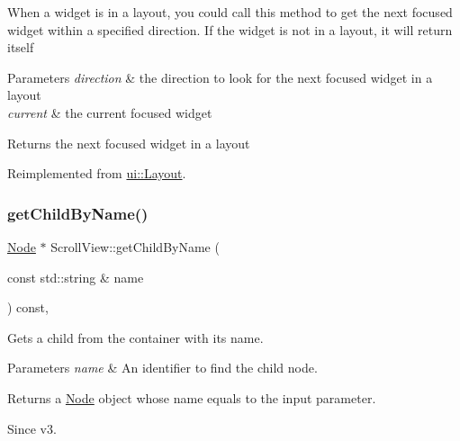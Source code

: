 When a widget is in a layout, you could call this method to get the next focused widget within a specified direction. If the widget is not in a layout, it will return itself 
\begin{DoxyParams}{Parameters}
{\em direction} & the direction to look for the next focused widget in a layout \\
\hline
{\em current} & the current focused widget \\
\hline
\end{DoxyParams}
\begin{DoxyReturn}{Returns}
the next focused widget in a layout 
\end{DoxyReturn}


Reimplemented from \hyperlink{classui_1_1Layout_a49f3db931bff292e279ddd65dcd3fe6f}{ui\+::\+Layout}.

\mbox{\label{classui_1_1ScrollView_a9750342974b85647eac63dc49db4292f}} 
\subsubsection{\texorpdfstring{get\+Child\+By\+Name()}{getChildByName()}\hspace{0.1cm}{\footnotesize\ttfamily [1/2]}}
{\footnotesize\ttfamily \hyperlink{classNode}{Node} $\ast$ Scroll\+View\+::get\+Child\+By\+Name (\begin{DoxyParamCaption}\item[{const std\+::string \&}]{name }\end{DoxyParamCaption}) const\hspace{0.3cm}{\ttfamily [override]}, {\ttfamily [virtual]}}

Gets a child from the container with its name.


\begin{DoxyParams}{Parameters}
{\em name} & An identifier to find the child node.\\
\hline
\end{DoxyParams}
\begin{DoxyReturn}{Returns}
a \hyperlink{classNode}{Node} object whose name equals to the input parameter.
\end{DoxyReturn}
\begin{DoxySince}{Since}
v3. 
\end{DoxySince}


